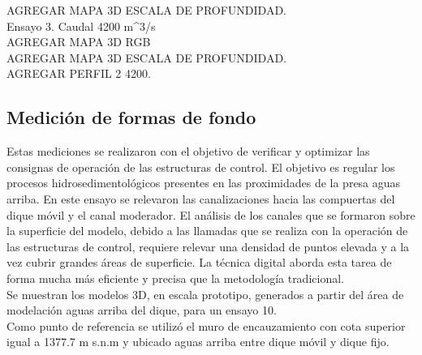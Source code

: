 AGREGAR MAPA 3D ESCALA DE PROFUNDIDAD.\\

Ensayo 3. Caudal 4200 m^{3}/s \\
AGREGAR MAPA 3D RGB \\

AGREGAR MAPA 3D ESCALA DE PROFUNDIDAD.\\

AGREGAR PERFIL 2 4200.\\

\subsection{Medición de formas de fondo}
\label{ensayo-formas-de-fondo}

Estas mediciones se realizaron con el objetivo de verificar y optimizar las consignas de operación de las estructuras de control. El objetivo es regular los procesos hidrosedimentológicos presentes en las proximidades de la presa aguas arriba.
En este ensayo se relevaron las canalizaciones hacia las compuertas del dique móvil y el canal moderador. El análisis de los canales que se formaron sobre la superficie del modelo, debido a las llamadas que se realiza con la operación de las estructuras de control, requiere relevar una densidad de puntos elevada y a la vez cubrir grandes áreas de superficie. La técnica digital aborda esta tarea de forma mucha más eficiente y precisa que la metodología tradicional. \\
Se muestran los modelos 3D, en escala prototipo, generados a partir del área de modelación aguas arriba del dique, para un ensayo 10.\\
Como punto de referencia se utilizó el muro de encauzamiento con cota superior igual a 1377.7 m s.n.m y ubicado aguas arriba entre dique móvil y dique fijo.

